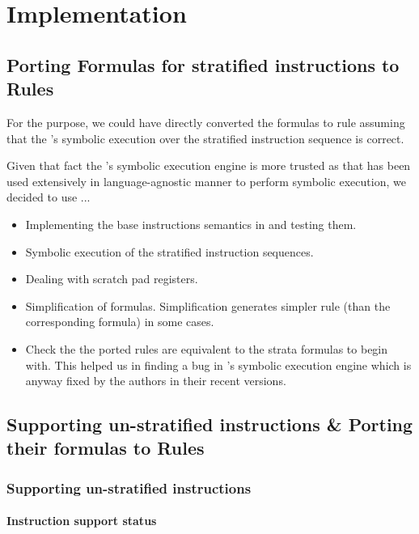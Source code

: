 \section{Implementation}

\subsection{Porting Formulas for stratified instructions to \K Rules}

For the purpose, we could have directly converted the \Strata formulas
to \K rule assuming that the \Strata's symbolic execution over the 
stratified instruction sequence is correct.

Given that fact the \K's symbolic execution engine is more trusted as 
that has been used extensively in language-agnostic manner to perform symbolic
execution, we decided to use ... 

\begin{itemize}
\item Implementing the base instructions semantics in \K and testing them.
\item Symbolic execution of the stratified instruction sequences.
\item Dealing with scratch pad registers.
\item Simplification of formulas.
  Simplification generates simpler \K rule (than the corresponding \Strata formula)
  in some cases. 
\item Check the the ported \K rules are equivalent to the strata formulas to
begin with. This helped us in finding a bug in \Strata's symbolic execution 
engine which is anyway fixed by the authors in their recent versions.

\end{itemize}

\subsection{Supporting un-stratified instructions \& Porting their formulas to \K Rules}

\subsubsection{Supporting un-stratified instructions}
\paragraph{Instruction support status}

